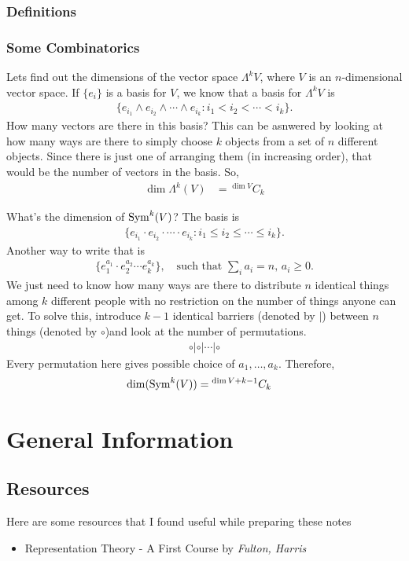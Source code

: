 \subsection{Definitions}
\label{sub:definitions}

\subsection{Some Combinatorics}
\label{sub:some_combinatorics}

Lets find out the dimensions of the vector space $\Lambda^k V$, where $V$ is an $n$-dimensional vector space.
If $\{e_i\}$ is a basis for $V$, we know that a basis for $\Lambda^k V$ is 
\begin{align}
    \{e_{i_1}\wedge e_{i_2} \wedge\cdots \wedge e_{i_k} : i_1 < i_2 < \cdots < i_k \}.
\end{align}
How many vectors are there in this basis? This can be asnwered by looking at how many ways are there to simply choose $k$ objects from a set of $n$ different objects. Since there is just one of arranging them (in increasing order), that would be the number of vectors in the basis. So,
\begin{align}
    \dim \Lambda^k (V) &= {}^{\dim V}C_k
    \label{eqn:dim_exteriorpower}
\end{align}

What's the dimension of $\operatorname{Sym}^k(V)$? The basis is
\begin{align}
    \{e_{i_1}\cdot e_{i_2} \cdot\cdots \cdot e_{i_k} : i_1 \leq i_2 \leq \cdots \leq i_k \}.
\end{align}
Another way to write that is
\begin{align}
    \{e_1^{a_1}\cdot e_2^{a_2} \cdots e_k^{a_k}\},\quad\text{such that } \sum_i a_i = n,\, a_i\geq 0.
\end{align}
We just need to know how many ways are there to distribute $n$ identical things among $k$ different people with no restriction on the number of things anyone can get. To solve this, introduce $k-1$ identical barriers (denoted by $|$) between $n$ things (denoted by $\circ$)and look at the number of permutations.
\begin{align}
    \circ | \circ | \cdots | \circ
\end{align}
Every permutation here gives possible choice of ${a_1,\dotsc,a_k}$. Therefore,
\begin{align}
    \dim (\operatorname{Sym}^k (V)) &= {}^{\dim V +k-1}C_{k}
    \label{eqn:dim_symmetricpower}
\end{align}


\chapter{General Information}

\section{Resources}
\label{sec:Resources}
Here are some resources that I found useful while preparing these notes
\begin{itemize}
    \item Representation Theory - A First Course by \emph{Fulton, Harris}
\end{itemize}


